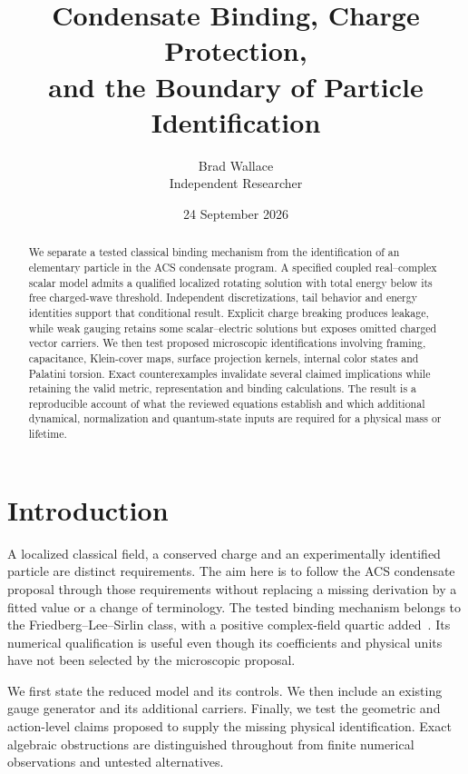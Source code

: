 \documentclass[11pt]{article}
\title{Condensate Binding, Charge Protection,\\and the Boundary of Particle Identification}
\author{Brad Wallace\\\small Independent Researcher}
\date{24 September 2026}
\begin{document}
\maketitle
\begin{abstract}
We separate a tested classical binding mechanism from the identification of
an elementary particle in the ACS condensate program. A specified coupled
real--complex scalar model admits a qualified localized rotating solution
with total energy below its free charged-wave threshold. Independent
discretizations, tail behavior and energy identities support that conditional
result. Explicit charge breaking produces leakage, while weak gauging retains
some scalar--electric solutions but exposes omitted charged vector carriers.
We then test proposed microscopic identifications involving framing,
capacitance, Klein-cover maps, surface projection kernels, internal color
states and Palatini torsion. Exact counterexamples invalidate several
claimed implications while retaining the valid metric, representation and
binding calculations. The result is a reproducible account of what the
reviewed equations establish and which additional dynamical, normalization
and quantum-state inputs are required for a physical mass or lifetime.
\end{abstract}

\section{Introduction}
A localized classical field, a conserved charge and an experimentally
identified particle are distinct requirements. The aim here is to follow the
ACS condensate proposal through those requirements without replacing a
missing derivation by a fitted value or a change of terminology.
The tested binding mechanism belongs to the Friedberg--Lee--Sirlin class,
with a positive complex-field quartic added~\cite{Heeck}. Its numerical
qualification is useful even though its coefficients and physical units
have not been selected by the microscopic proposal.

We first state the reduced model and its controls. We then include an
existing gauge generator and its additional carriers. Finally, we test the
geometric and action-level claims proposed to supply the missing physical
identification. Exact algebraic obstructions are distinguished throughout
from finite numerical observations and untested alternatives.
\end{document}
